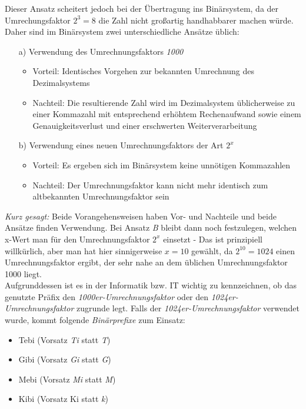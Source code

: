 \documentclass[a4paper, 12pt]{report}
\begin{document}
Dieser Ansatz scheitert jedoch bei der Übertragung ins Binärsystem, da der 
Umrechungsfaktor \emph{$2^3 = 8$} die Zahl nicht großartig handhabbarer machen
würde. Daher sind im Binärsystem zwei unterschiedliche Ansätze üblich:

\begin{itemize}
    \item[a)] Verwendung des Umrechnungsfaktors \emph{1000}
        \begin{itemize}
            \item Vorteil: Identisches Vorgehen zur bekannten Umrechnung des 
                Dezimalsystems
            \item Nachteil: Die resultierende Zahl wird im Dezimalsystem 
                üblicherweise zu einer Kommazahl mit entsprechend erhöhtem 
                Rechenaufwand sowie einem Genauigkeitsverlust und einer 
                erschwerten Weiterverarbeitung
        \end{itemize}
    \item[b)] Verwendung eines neuen Umrechnungsfaktors der Art $2^x$
        \begin{itemize}
            \item Vorteil: Es ergeben sich im Binärsystem keine unnötigen 
                Kommazahlen
            \item Nachteil: Der Umrechnungsfaktor kann nicht mehr identisch zum
                altbekannten Umrechnungsfaktor sein
        \end{itemize}
\end{itemize}

\emph{Kurz gesagt:}  Beide Vorangehensweisen haben Vor- und Nachteile und beide 
Ansätze finden Verwendung. Bei Ansatz \emph{B} bleibt dann noch festzulegen, 
welchen x-Wert man für den Umrechnungsfaktor $2^x$ einsetzt - Das ist 
prinzipiell willkürlich, aber man hat hier sinnigerweise $x = 10$ gewählt, da 
$2^10 = 1024$ einen Umrechnungsfaktor ergibt, der sehr nahe an dem üblichen 
Umrechnungsfaktor 1000 liegt. \\

Aufgrunddessen ist es in der Informatik bzw. IT wichtig zu kennzeichnen, ob
das genutzte Präfix den \emph{1000er-Umrechnungsfaktor} oder den 
\emph{1024er-Umrechnungsfaktor} zugrunde legt. Falls der 
\emph{1024er-Umrechnungsfaktor} verwendet wurde, kommt folgende 
\emph{Binärprefixe} zum Einsatz: 

\begin{itemize}
    \item Tebi (Vorsatz \emph{Ti} statt \emph{T})
    \item Gibi (Vorsatz \emph{Gi} statt \emph{G})
    \item Mebi (Vorsatz \emph{Mi} statt \emph{M})
    \item Kibi (Vorsatz {Ki} statt \emph{k})
\end{itemize}
\end{document}
